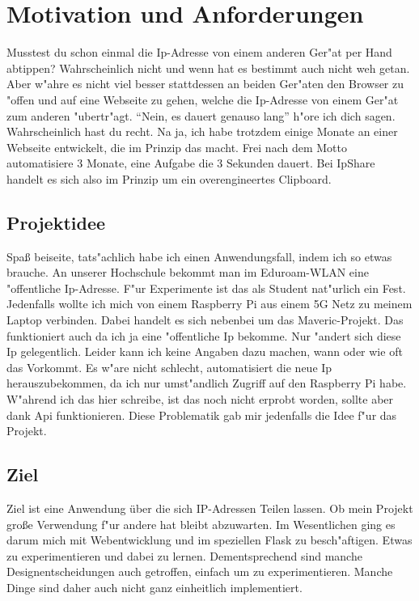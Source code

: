 
\chapter{Motivation und Anforderungen}\label{ch:motivation-und-anforderungen}
Musstest du schon einmal die Ip-Adresse von einem anderen Ger{"a}t per Hand abtippen?
Wahrscheinlich nicht und wenn hat es bestimmt auch nicht weh getan.
Aber w{"a}hre es nicht viel besser stattdessen an beiden Ger{"a}ten den Browser zu {"o}ffen und auf eine Webseite zu gehen,
welche die Ip-Adresse von einem Ger{"a}t zum anderen {"u}bertr{"a}gt.
``Nein, es dauert genauso lang'' h{"o}re ich dich sagen.
Wahrscheinlich hast du recht.
Na ja, ich habe trotzdem einige Monate an einer Webseite entwickelt, die im Prinzip das macht.
Frei nach dem Motto automatisiere 3 Monate, eine Aufgabe die 3 Sekunden dauert.
Bei IpShare handelt es sich also im Prinzip um ein overengineertes Clipboard.


\section{Projektidee}\label{sec:projektidee}
Spa{\ss} beiseite, tats{"a}chlich habe ich einen Anwendungsfall, indem ich so etwas brauche.
An unserer Hochschule bekommt man im Eduroam-WLAN eine {"o}ffentliche Ip-Adresse.
F{"u}r Experimente ist das als Student nat{"u}rlich ein Fest.
Jedenfalls wollte ich mich von einem Raspberry Pi aus einem 5G Netz zu meinem Laptop verbinden.
Dabei handelt es sich nebenbei um das Maveric-Projekt.
Das funktioniert auch da ich ja eine {"o}ffentliche Ip bekomme.
Nur {"a}ndert sich diese Ip gelegentlich.
Leider kann ich keine Angaben dazu machen, wann oder wie oft das Vorkommt.
Es w{"a}re nicht schlecht, automatisiert die neue Ip herauszubekommen, da ich nur umst{"a}ndlich Zugriff auf den Raspberry Pi habe.
W{"a}hrend ich das hier schreibe, ist das noch nicht erprobt worden, sollte aber dank Api funktionieren.
Diese Problematik gab mir jedenfalls die Idee f{"u}r das Projekt.

\section{Ziel}\label{sec:ziel}
Ziel ist eine Anwendung über die sich IP-Adressen Teilen lassen.
Ob mein Projekt gro{\ss}e Verwendung f{"u}r andere hat bleibt abzuwarten.
Im Wesentlichen ging es darum mich mit Webentwicklung und im speziellen Flask zu besch{"a}ftigen.
Etwas zu experimentieren und dabei zu lernen.
Dementsprechend sind manche Designentscheidungen auch getroffen, einfach um zu experimentieren.
Manche Dinge sind daher auch nicht ganz einheitlich implementiert.

